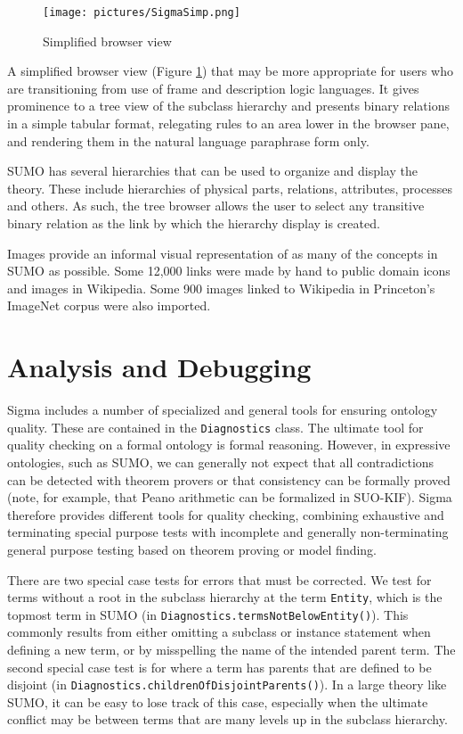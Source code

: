 \documentclass{book}
\begin{document}
\begin{figure}
  \centering
  \texttt{[image: pictures/SigmaSimp.png]}
  \caption{Simplified browser view}
  \label{fig:SigmaSimp}
\end{figure}

A simplified browser view (Figure \ref{fig:SigmaSimp}) that may
be more appropriate for users who are transitioning from use of frame and
description logic languages.  It gives prominence to a
tree view of the subclass hierarchy and presents binary relations in a simple
tabular format, relegating rules to an area lower in the browser pane, and
rendering them in the natural language paraphrase form only.

SUMO has several hierarchies that can be used to organize and display the
theory.  These include hierarchies of physical parts, relations, attributes,
processes and others.  As such, the tree browser allows the user to select any
transitive binary relation as the link by
which the hierarchy display is created. 

Images provide an informal visual representation of as many of the concepts in
SUMO as possible.  Some 12,000 links were made by hand to public domain icons
and images in Wikipedia.  Some 900 images linked to Wikipedia in
Princeton's ImageNet \cite{deng2009} corpus were also imported.

\section{Analysis and Debugging}
\label{chap:KnowEngi:sec:Anal}

Sigma includes a number of specialized and general tools for ensuring ontology
quality. These are contained in the
\texttt{Diagnostics} class. The ultimate tool for
quality checking on a formal ontology is formal reasoning.  However, in
expressive ontologies, such as SUMO, we can generally not expect that all
contradictions can be detected with theorem provers or that
consistency can be formally proved (note, for example, that Peano arithmetic can
be formalized in SUO-KIF). Sigma
therefore provides different tools for quality checking, combining exhaustive
and terminating special purpose tests with incomplete and generally
non-terminating general purpose testing based on theorem proving or model
finding. 

There are two special case tests for errors that must be corrected.  We test for
terms without a root in the subclass hierarchy at the term {\tt Entity}, which
is the topmost term in SUMO (in \texttt{Diagnostics.termsNotBelowEntity()}).
This commonly results from either omitting a subclass or instance statement when
defining a new term, or by misspelling the name of the intended parent term. The
second special case test is for where a term has parents that are defined to be
disjoint (in \texttt{Diagnostics.childrenOfDisjointParents()}).  In a large
theory like SUMO, it can be easy to lose track of this case, especially when the
ultimate conflict may be between terms that are many levels up in the subclass
hierarchy.
\end{document}
